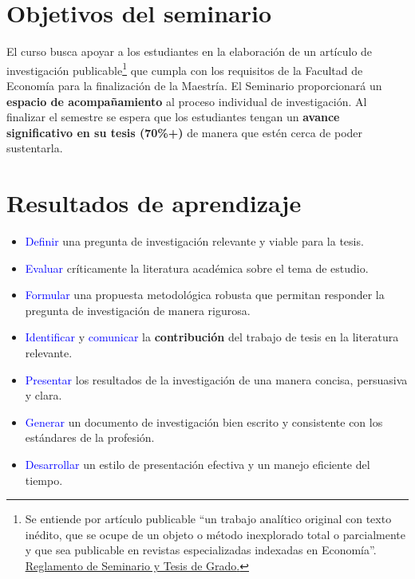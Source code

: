 \documentclass[12pt]{article}
\begin{document}

\section{Objetivos del seminario}

El curso busca apoyar a los estudiantes en la elaboración de un artículo de investigación publicable\footnote{Se entiende por artículo publicable ``un trabajo analítico original con texto inédito, que se ocupe de un objeto o método inexplorado total o parcialmente y que sea publicable en revistas especializadas indexadas en Economía''. \href{https://economia.uniandes.edu.co/reglamentos-peg}{\underline{Reglamento de Seminario y Tesis de Grado}.}} que cumpla con los requisitos de la Facultad de Economía para la finalización de la Maestría. El Seminario proporcionará un \textbf{espacio de acompañamiento} al proceso individual de investigación. Al finalizar el semestre se espera que los estudiantes tengan un \textbf{avance significativo en su tesis (70\%+)} de manera que estén cerca de poder sustentarla.

\section{Resultados de aprendizaje}

\begin{itemize}
    \item \textcolor{blue}{Definir} una pregunta de investigación relevante y viable para la tesis.
    
    \item \textcolor{blue}{Evaluar} críticamente la literatura académica sobre el tema de estudio.
    
    \item \textcolor{blue}{Formular} una propuesta metodológica robusta que permitan responder la pregunta de investigación de manera rigurosa. 
    
    \item \textcolor{blue}{Identificar} y \textcolor{blue}{comunicar} la \textbf{contribución} del trabajo de tesis en la literatura relevante. 
    
    \item \textcolor{blue}{Presentar} los resultados de la investigación de una manera concisa, persuasiva y clara.
    
    \item \textcolor{blue}{Generar} un documento de investigación bien escrito y consistente con los estándares de la profesión. 

    \item \textcolor{blue}{Desarrollar} un estilo de presentación efectiva y un manejo eficiente del tiempo.
\end{itemize}
\end{document}

